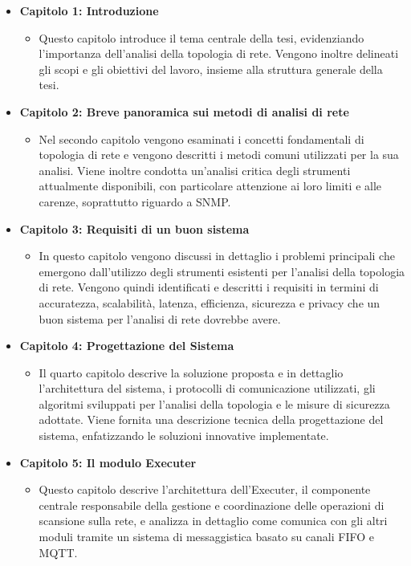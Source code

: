 \documentclass[target=bach,aauheader=,style=]{thud}
\begin{document}
\begin{itemize}
  \item \textbf{Capitolo 1: Introduzione}
  \begin{itemize}
    \item[] Questo capitolo introduce il tema centrale della tesi, evidenziando l'importanza dell'analisi della topologia di rete. Vengono inoltre delineati gli scopi e gli obiettivi del lavoro, insieme alla struttura generale della tesi.
  \end{itemize}


\item \textbf{Capitolo 2: Breve panoramica sui metodi di analisi di rete}
    \begin{itemize}
      \item[] Nel secondo capitolo vengono esaminati i concetti fondamentali di topologia di rete e vengono descritti i metodi comuni utilizzati per la sua analisi. Viene inoltre condotta un'analisi critica degli strumenti attualmente disponibili, con particolare attenzione ai loro limiti e alle carenze, soprattutto riguardo a SNMP.
    \end{itemize}


  \item \textbf{Capitolo 3: Requisiti di un buon sistema}
    \begin{itemize}
      \item[] In questo capitolo vengono discussi in dettaglio i problemi principali che emergono dall'utilizzo degli strumenti esistenti per l'analisi della topologia di rete. Vengono quindi identificati e descritti i requisiti in termini di accuratezza, scalabilità, latenza, efficienza, sicurezza e privacy che un buon sistema per l'analisi di rete dovrebbe avere.
    \end{itemize}


  \item \textbf{Capitolo 4: Progettazione del Sistema}
    \begin{itemize}
      \item[] Il quarto capitolo descrive la soluzione proposta e in dettaglio l'architettura del sistema, i protocolli di comunicazione utilizzati, gli algoritmi sviluppati per l'analisi della topologia e le misure di sicurezza adottate. Viene fornita una descrizione tecnica della progettazione del sistema, enfatizzando le soluzioni innovative implementate.
    \end{itemize}


  \item \textbf{Capitolo 5: Il modulo Executer}
    \begin{itemize}
      \item[] Questo capitolo descrive l'architettura dell'Executer, il componente centrale responsabile della gestione e coordinazione delle operazioni di scansione sulla rete, e analizza in dettaglio come comunica con gli altri moduli tramite un sistema di messaggistica basato su canali FIFO e MQTT.
    \end{itemize}



\end{itemize}
\end{document}
